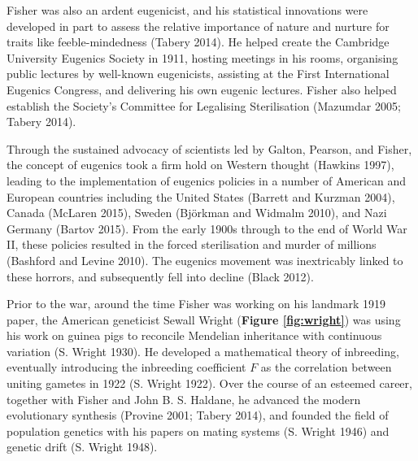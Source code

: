 \documentclass[
]{book}
\begin{document}
Fisher was also an ardent eugenicist, and his statistical innovations were developed in part to assess the relative importance of nature and nurture for traits like feeble-mindedness (Tabery 2014). He helped create the Cambridge University Eugenics Society in 1911, hosting meetings in his rooms, organising public lectures by well-known eugenicists, assisting at the First International Eugenics Congress, and delivering his own eugenic lectures. Fisher also helped establish the Society's Committee for Legalising Sterilisation (Mazumdar 2005; Tabery 2014).

Through the sustained advocacy of scientists led by Galton, Pearson, and Fisher, the concept of eugenics took a firm hold on Western thought (Hawkins 1997), leading to the implementation of eugenics policies in a number of American and European countries including the United States (Barrett and Kurzman 2004), Canada (McLaren 2015), Sweden (Björkman and Widmalm 2010), and Nazi Germany (Bartov 2015). From the early 1900s through to the end of World War II, these policies resulted in the forced sterilisation and murder of millions (Bashford and Levine 2010). The eugenics movement was inextricably linked to these horrors, and subsequently fell into decline (Black 2012).

Prior to the war, around the time Fisher was working on his landmark 1919 paper, the American geneticist Sewall Wright (\textbf{Figure \ref{fig:wright}}) was using his work on guinea pigs to reconcile Mendelian inheritance with continuous variation (S. Wright 1930). He developed a mathematical theory of inbreeding, eventually introducing the inbreeding coefficient \(F\) as the correlation between uniting gametes in 1922 (S. Wright 1922). Over the course of an esteemed career, together with Fisher and John B. S. Haldane, he advanced the modern evolutionary synthesis (Provine 2001; Tabery 2014), and founded the field of population genetics with his papers on mating systems (S. Wright 1946) and genetic drift (S. Wright 1948).
\end{document}
